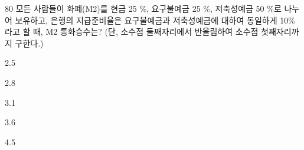 \begin{question}{80}
모든 사람들이 화폐(M2)를 현금 25 \%, 요구불예금 25 \%, 저축성예금 50 \%로 나누어 보유하고, 은행의 지급준비율은 요구불예금과 저축성예금에 대하여 동일하게 10\%라고 할 때, M2 통화승수는? (단, 소수점 둘째자리에서 반올림하여 소수점 첫째자리까지 구한다.)
\begin{choices}
  \item 2.5
  \item 2.8
  \item 3.1
  \item 3.6
  \item 4.5
\end{choices}
\end{question}
